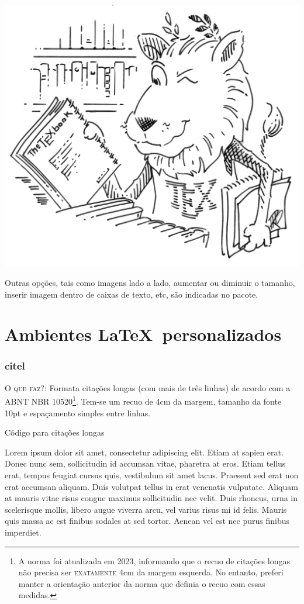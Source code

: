 \documentclass[a4paper,12pt,oneside,openright,extrafontsizes,openbib]{memoir}
\begin{document}
{\begin{multicols}{2}
	\includegraphics[scale=.040]{./img/tex-lion.png}
\end{multicols}

Outras opções, tais como imagens lado a lado, aumentar ou diminuir o tamanho, inserir imagem dentro de caixas de texto, etc, são indicadas no pacote.

\chapter{Ambientes \LaTeX\ personalizados}

\subsection{citel}

\textsc{O que faz?}: Formata citações longas (com mais de três linhas) de acordo com a ABNT NBR 10520\footnote{A norma foi atualizada em 2023, informando que o recuo de citações longas não precisa ser \textsc{exatamente} 4cm da margem esquerda. No entanto, preferi manter a orientação anterior da norma que definia o recuo com essas medidas.}. Tem-se um recuo de 4cm da margem, tamanho da fonte 10pt e espaçamento simples entre linhas.

\begin{codex}{Código para citações longas}
	\begin{citel}
		Lorem ipsum dolor sit amet, consectetur adipiscing elit. Etiam at sapien erat. Donec nunc sem, sollicitudin id accumsan vitae, pharetra at eros. Etiam tellus erat, tempus feugiat cursus quis, vestibulum sit amet lacus. Praesent sed erat non erat accumsan aliquam. Duis volutpat tellus in erat venenatis vulputate. Aliquam at mauris vitae risus congue maximus sollicitudin nec velit. Duis rhoncus, urna in scelerisque mollis, libero augue viverra arcu, vel varius risus mi id felis. Mauris quis massa ac est finibus sodales at sed tortor. Aenean vel est nec purus finibus imperdiet.
	\end{citel}
\end{codex}

}
\end{document}
